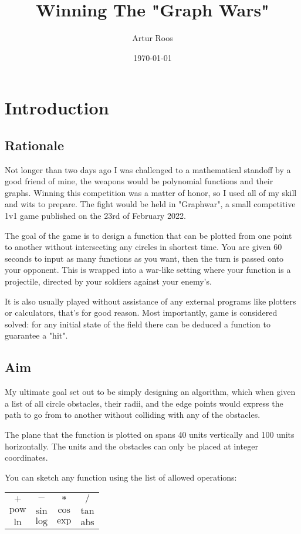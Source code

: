 \documentclass[12pt, titlepage]{article}
\title{Winning The "Graph Wars"}
\author{Artur Roos}
\date{\today}
\begin{document}
\maketitle
\tableofcontents

\section{Introduction}
\subsection{Rationale}
Not longer than two days ago I was challenged to a mathematical standoff by a 
good friend of mine, the weapons would be polynomial functions and their 
graphs. Winning this competition was a matter of honor, so I used all of my 
skill and wits to prepare. The fight would be held in \mbox{"Graphwar"}, a 
small competitive 1v1 game published on the 23rd of February 2022. 

The goal of the game is to design a function that can be plotted from one point
to another without intersecting any circles in shortest time. You are given 
60 seconds to input as many functions as you want, then the turn is passed onto
your opponent.
This is wrapped into a war-like setting where your function is a projectile, 
directed by your soldiers against your enemy's.

It is also usually played without assistance of any external programs like 
plotters or calculators, that's for good reason. Most importantly, game is
considered solved: for any initial state of the field there can be deduced a 
function to guarantee a "hit". 

\subsection{Aim}
My ultimate goal set out to be simply designing an algorithm, which when given
a list of all circle obstacles, their radii, and the edge points would express
the path to go from to another without colliding with any of the obstacles. 

The plane that the function is plotted on spans 40 units vertically and 
100 units horizontally. The units and the obstacles can only be placed at 
integer coordinates. 

You can sketch any function using the list of allowed 
operations:

{
\centering
\begin{tabular}{c c c c}
    $+$ & $-$ & $*$ & $/$ \\
    $\mathrm{pow}$ & $\mathrm{sin}$ & $\mathrm{cos}$ & $\mathrm{tan}$\\
    $\mathrm{ln}$ & $\mathrm{log}$ & $\mathrm{exp}$ & $\mathrm{abs}$\\
\end{tabular}\par
}
\end{document}
